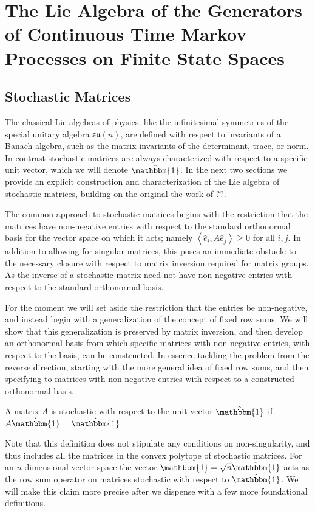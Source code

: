 \chapter{The Lie Algebra of the Generators of Continuous Time Markov Processes on Finite State Spaces}
\section{Stochastic Matrices}
The classical Lie algebras of physics, like the infinitesimal symmetries
of the special unitary algebra $\mathfrak{su}(n)$, are defined with respect to
invariants of a Banach algebra, such as the matrix invariants of the 
determinant, trace, or norm. In contrast stochastic matrices are always 
characterized with respect to a specific unit vector, which we will denote 
$\hat{\mathbbm{1}}$. In the next two sections we provide an explicit 
construction and characterization of the Lie algebra of stochastic matrices, 
building on the original the work of ??.

The common approach to stochastic matrices begins with the restriction that the 
matrices have non-negative entries with respect to the standard orthonormal 
basis for the vector space on which it acts; namely $\left\langle\hat{e}_i,A \hat{e}_j\right\rangle \ge 0$
for all $i,j$. In addition to allowing for singular matrices, this poses an 
immediate obstacle to the necessary closure with respect to matrix inversion 
required for matrix groups. As the inverse of a stochastic matrix need not have 
non-negative entries with respect to the standard orthonormal basis. 

For the moment we will set aside the restriction that the entries be 
non-negative, and instead begin with a generalization of the concept of fixed 
row sums. We will show that this generalization is preserved by matrix 
inversion, and then develop an orthonormal basis from which specific matrices 
with non-negative entries, with respect to the basis, can be constructed. In 
essence tackling the problem from the reverse direction, starting with the more 
general idea of fixed row sums, and then specifying to matrices with 
non-negative entries with respect to a constructed orthonormal basis.

\begin{definition}
	A matrix $A$ is stochastic with respect to the unit vector $\hat{\mathbbm{1}}$ 
	if $A \hat{\mathbbm{1}} = \hat{\mathbbm{1}}$
\end{definition}

Note that this definition does not stipulate any conditions on non-singularity,
and thus includes all the matrices in the convex polytope of stochastic 
matrices. For an $n$ dimensional vector space the vector $\vec{\mathbbm{1}} = \sqrt{n} \hat{\mathbbm{1}}$ 
acts as the row sum operator on matrices stochastic with respect to $\hat{\mathbbm{1}}$. 
We will make this claim more precise after we dispense with a few more 
foundational definitions.

